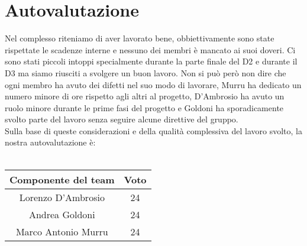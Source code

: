 \section{Autovalutazione}
Nel complesso riteniamo di aver lavorato bene, obbiettivamente sono state rispettate le scadenze interne e nessuno dei membri è mancato ai suoi doveri. Ci sono stati piccoli intoppi specialmente durante la parte finale del D2 e durante il D3 ma siamo riusciti a svolgere un buon lavoro. Non si può però non dire che ogni membro ha avuto dei difetti nel suo modo di lavorare, Murru ha dedicato un numero minore di ore rispetto agli altri al progetto, D'Ambrosio ha avuto un ruolo minore durante le prime fasi del progetto e Goldoni ha sporadicamente svolto parte del lavoro senza seguire alcune direttive del gruppo. \\
Sulla base di queste considerazioni e della qualità complessiva del lavoro svolto, la nostra autovalutazione è: 
\\
\\
\begin{tabular}{ |c|c| } 
 \hline
 \textbf{Componente del team} & \textbf{Voto} \\
 \hline
 Lorenzo D'Ambrosio & 24 \\ 
 \hline
 Andrea Goldoni & 24 \\ 
 \hline
 Marco Antonio Murru & 24  \\ 
 \hline
\end{tabular}